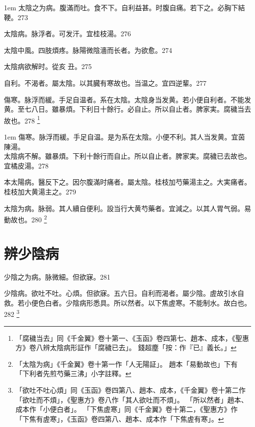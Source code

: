 \hangindent 1em
太陰之为病。腹滿而吐。食不下。自利益甚。时腹自痛。若下之。必胸下結鞕。{\zhaoben}273

%

太陰病。脉浮者。可发汗。宜桂枝湯。276

太陰中風。四肢煩疼。{\khaai 脉}陽微陰濇而长者。为欲愈。274

太陰病欲解时。從亥{\sungii 𥁞}丑。275

自利。不渴者。屬太陰。以其臓有寒故也。当温之。宜四逆輩。277

傷寒。脉浮而緩。手足自温者。系在太陰。太陰{\khaai 身}当发黄。若小便自利者。不能发黄。至七八日。雖暴煩。下利日十餘行。必自止。所以自止者。脾家実。腐穢当去故也。278
	\footnote{
		「腐穢当去」同《千金翼》卷十第一、《玉函》卷四第七、趙本、成本，《聖惠方》卷八辨太陰病形証作「腐穢已去」。
		錢超塵「按：作『已』義长。」
	}

\hangindent 1em
傷寒。脉浮而緩。手足自温。是为系在太陰。小便不利。其人当发黄。宜茵陳湯。\\
太陰病不解。雖暴煩。下利十餘行而自止。所以自止者。脾家実。腐穢已去故也。宜橘皮湯。278{\shenghui}

{\khaai 本}太陽病。醫反下之。因尔腹滿时痛者。屬太陰。桂枝加芍藥湯主之。大実痛者。桂枝加大黄湯主之。279

太陰为病。脉弱。其人續自便利。設当行大黄芍藥者。宜減之。以其人胃气弱。易動故也。280
	\footnote{
		「太陰为病」《千金翼》卷十第一作「人无陽証」。
		趙本「易動故也」下有「下利者先煎芍藥三沸」小字註釋。
	}

\chapter{辨少陰病}

少陰之为病。脉微細。但欲寐。281

少陰病。欲吐不吐。心煩。但欲寐。五六日。自利而渴者。屬少陰。虗故引水自救。若小便色白者。少陰病形悉具。所以然者。以下焦虗寒。不能制水。故白也。282
	\footnote{
		「欲吐不吐心煩」同《玉函》卷四第八、趙本、成本，《千金翼》卷十第二作「欲吐而不煩」，《聖惠方》卷八作「其人欲吐而不煩」。
		「所以然者」趙本、成本作「小便白者」。
		「下焦虗寒」同《千金翼》卷十第二，《聖惠方》作「下焦有虗寒」，《玉函》卷四第八、趙本、成本作「下焦虗有寒」。
	}

